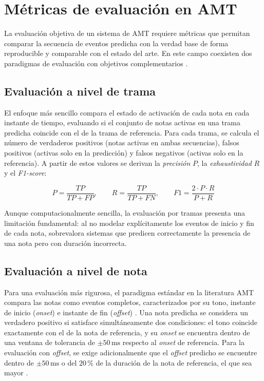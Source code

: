 \section{Métricas de evaluación en AMT}
\label{sec:metricas}

La evaluación objetiva de un sistema de AMT requiere métricas que
permitan comparar la secuencia de eventos predicha con la verdad base
de forma reproducible y comparable con el estado del arte. En este campo
coexisten dos paradigmas de evaluación con objetivos complementarios
\cite{benetos2019automatic}.

\subsection{Evaluación a nivel de trama}

El enfoque más sencillo compara el estado de activación de cada nota en
cada instante de tiempo, evaluando si el conjunto de notas activas en una
trama predicha coincide con el de la trama de referencia. Para cada
trama, se calcula el número de verdaderos positivos (notas activas en
ambas secuencias), falsos positivos (activas solo en la predicción) y
falsos negativos (activas solo en la referencia). A partir de estos
valores se derivan la \textit{precisión} $P$, la \textit{exhaustividad}
$R$ y el \textit{F1-score}:

\begin{equation}
    P = \frac{TP}{TP + FP}, \qquad
    R = \frac{TP}{TP + FN}, \qquad
    F1 = \frac{2 \cdot P \cdot R}{P + R}
    \label{eq:f1}
\end{equation}

Aunque computacionalmente sencilla, la evaluación por tramas presenta
una limitación fundamental: al no modelar explícitamente los eventos de
inicio y fin de cada nota, sobrevalora sistemas que predicen
correctamente la presencia de una nota pero con duración incorrecta.

\subsection{Evaluación a nivel de nota}

Para una evaluación más rigurosa, el paradigma estándar en la literatura
AMT compara las notas como eventos completos, caracterizados por su tono,
instante de inicio (\textit{onset}) e instante de fin (\textit{offset})
\cite{benetos2019automatic}. Una nota predicha se considera un verdadero
positivo si satisface simultáneamente dos condiciones: el tono coincide
exactamente con el de la nota de referencia, y su \textit{onset} se
encuentra dentro de una ventana de tolerancia de $\pm 50\,\mathrm{ms}$
respecto al \textit{onset} de referencia. Para la evaluación con
\textit{offset}, se exige adicionalmente que el \textit{offset} predicho
se encuentre dentro de $\pm 50\,\mathrm{ms}$ o del $20\,\%$ de la
duración de la nota de referencia, el que sea mayor
\cite{muller2021fundamentals}.

